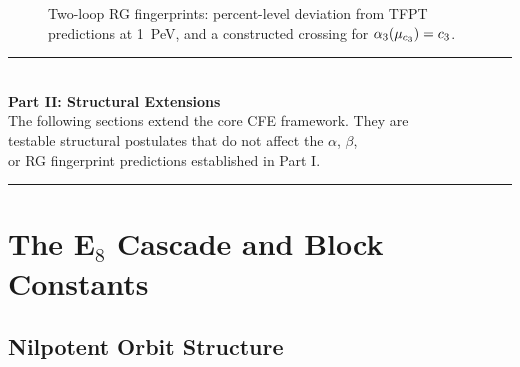 \begin{figure}[H]
\centering
{}
\caption{Two-loop RG fingerprints: percent-level deviation from TFPT predictions at 1~PeV, and a constructed crossing for $\alpha_3(\mu_{c_3})=c_3$.}
\label{fig:twoloop}
\end{figure}

\vspace{1em}
\begin{center}
\rule{0.8\textwidth}{0.5pt}\\[0.5em]
{\Large\bfseries Part II: Structural Extensions}\\[0.3em]
{\small The following sections extend the core CFE framework. They are \\
testable structural postulates that do not affect the $\alpha$, $\beta$, \\
or RG fingerprint predictions established in Part I.}\\[0.5em]
\rule{0.8\textwidth}{0.5pt}
\end{center}
\vspace{1em}

\section{\texorpdfstring{The E$_8$ Cascade and Block Constants}{The E8 Cascade and Block Constants}}
\label{sec:e8}

\subsection{Nilpotent Orbit Structure}

